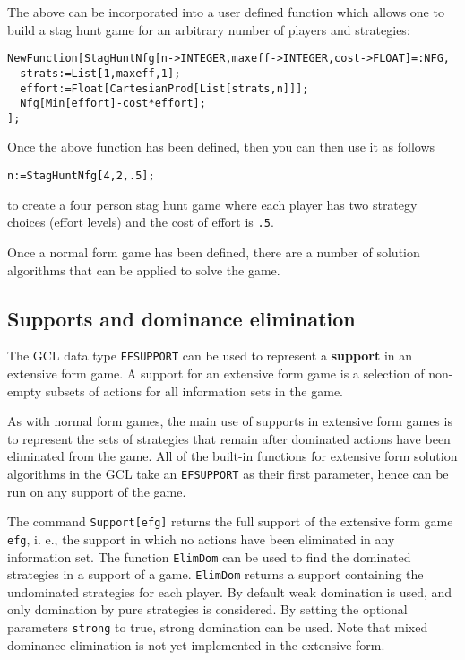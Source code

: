 The above can be incorporated into a user defined function which
allows one to build a stag hunt game for an arbitrary number of
players and strategies:  

\begin{verbatim}
NewFunction[StagHuntNfg[n->INTEGER,maxeff->INTEGER,cost->FLOAT]=:NFG,
  strats:=List[1,maxeff,1];
  effort:=Float[CartesianProd[List[strats,n]]];
  Nfg[Min[effort]-cost*effort];
];
\end{verbatim}

\noindent
Once the above function has been defined, then you can then use it as
follows

\begin{verbatim}
n:=StagHuntNfg[4,2,.5];
\end{verbatim}

\noindent
to create a four person stag hunt game where each player has two
strategy choices (effort levels) and the cost of effort is \verb+.5+.

Once a normal form game has been defined, there are a number of
solution algorithms that can be applied to solve the game.  

\subsection{Supports and dominance elimination}

The GCL data type \verb+EFSUPPORT+ can be used to represent a {\bf
support} in an extensive form game.  A support for an extensive form
game is a selection of non-empty subsets of actions for all
information sets in the game.

As with normal form games, the main use of supports in extensive form
games is to represent the sets of strategies that remain after
dominated actions have been eliminated from the game.  All of the
built-in functions for extensive form solution algorithms in the GCL
take an \verb+EFSUPPORT+ as their first parameter, hence can be run on
any support of the game.

The command \verb+Support[efg]+ returns the full support of the
extensive form game \verb+efg+, i. e., the support in which no actions
have been eliminated in any information set.  The function
\verb+ElimDom+ can be used to find the dominated strategies in a
support of a game.  \verb+ElimDom+ returns a support containing the
undominated strategies for each player.  By default weak domination is
used, and only domination by pure strategies is considered. By setting
the optional parameters \verb+strong+ to true, strong domination can
be used.  Note that mixed dominance elimination is not yet implemented
in the extensive form.  

